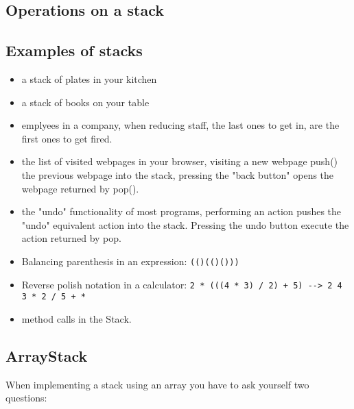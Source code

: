 \documentclass[a4paper, 9pt]{extarticle}
\begin{document}
\subsection{Operations on a stack}






\subsection{Examples of stacks}

\begin{itemize}

  \item a stack of plates in your kitchen

  \item a stack of books on your table

  \item emplyees in a company, when reducing staff, the last ones to get in,
    are the first ones to get fired.

  \item the list of visited webpages in your browser, visiting a new webpage
    push() the previous webpage into the stack, pressing the "back button"
    opens the webpage returned by pop().

  \item the "undo" functionality of most programs, performing an action pushes
    the "undo" equivalent action into the stack. Pressing the undo button
    execute the action returned by pop.

  \item Balancing parenthesis in an expression: \verb+(()(()()))+

  \item Reverse polish notation in a calculator: \verb;2 * (((4 * 3) / 2) + 5) --> 2 4 3 * 2 / 5 + *;

  \item method calls in the Stack.

\end{itemize}





\subsection{ArrayStack}

When implementing a stack using an array you have to ask yourself two questions:
\end{document}
